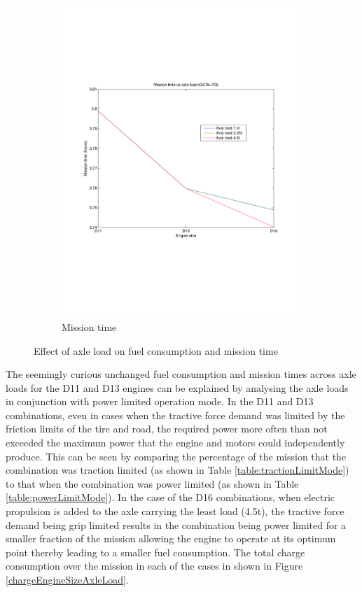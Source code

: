 \documentclass{article}
\begin{document}
\begin{figure}[h!]
\begin{subfigure}{.5\textwidth}
	\includegraphics[width=\linewidth, clip=true, trim=45 185 65 206]{Figures/Effect_of_axle_load/Mission_time_vs_axle_load_and_engine_size.pdf}
	\caption{Mission time}
\end{subfigure}
\caption{Effect of axle load on fuel consumption and mission time}
\label{fuelTimeEngineAxleLoad}
\end{figure}

The seemingly curious unchanged fuel consumption and mission times across axle loads for the D11 and D13 engines can be explained by analysing the axle loads in conjunction with power limited operation mode. In the D11 and D13 combinations, even in cases when the tractive force demand was limited by the friction limits of the tire and road, the required power more often than not exceeded the maximum power that the engine and motors could independently produce. This can be seen by comparing the percentage of the mission that the combination was traction limited (as shown in Table \ref{table:tractionLimitMode}) to that when the combination was power limited (as shown in Table \ref{table:powerLimitMode}). In the case of the D16 combinations, when electric propulsion is added to the axle carrying the least load (4.5t), the tractive force demand being grip limited results in the combination being power limited for a smaller fraction of the mission allowing the engine to operate at its optimum point thereby leading to a smaller fuel consumption. The total charge consumption over the mission in each of the cases in shown in Figure \ref{chargeEngineSizeAxleLoad}.\\
\end{document}
